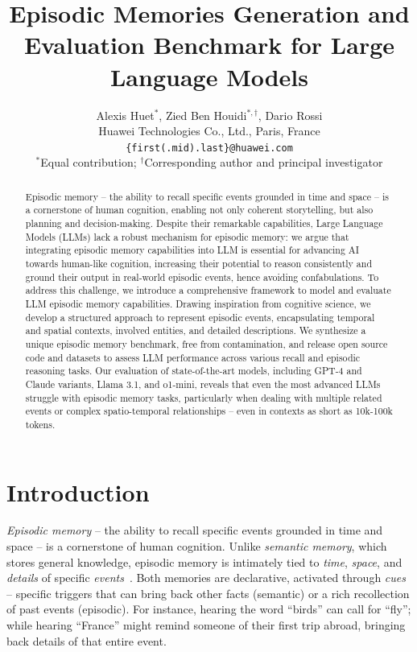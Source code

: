 \documentclass{article}
\title{Episodic Memories Generation and Evaluation Benchmark for Large Language Models}
\author{Alexis Huet$^{*}$, Zied Ben Houidi$^{*,\dagger}$, Dario Rossi\\
Huawei Technologies Co., Ltd., Paris, France \\
\texttt{\{first(.mid).last\}@huawei.com} \\
\small{$^*$Equal contribution}; \small{$^\dagger$Corresponding author and principal investigator}
}
\begin{document}
\maketitle

\begin{abstract}
Episodic memory -- the ability to recall specific events grounded in time and space -- is a cornerstone of human cognition, enabling not only coherent storytelling, but also planning and decision-making. Despite their remarkable capabilities, Large Language Models (LLMs) lack a robust mechanism for episodic memory: we argue that integrating episodic memory capabilities into LLM is essential for advancing AI towards human-like cognition, increasing their potential to reason consistently and ground their output in real-world episodic events, hence avoiding confabulations. To address this challenge, we introduce a comprehensive framework to model and evaluate LLM episodic memory capabilities. Drawing inspiration from cognitive science, we develop a structured approach to represent episodic events, encapsulating temporal and spatial contexts, involved entities, and detailed descriptions. We synthesize a unique episodic memory benchmark, free from contamination,
and release open source code and datasets to assess LLM performance across various recall and episodic reasoning tasks. Our evaluation of state-of-the-art models, including GPT-4 and Claude variants, Llama 3.1, and o1-mini, reveals that even the most advanced LLMs struggle with episodic memory tasks, particularly when dealing with multiple related events or complex spatio-temporal relationships -- even in contexts as short as 10k-100k tokens. 
\end{abstract}




\section{Introduction}
\textit{Episodic memory} -- the ability to recall specific events grounded in time and space -- is a cornerstone of human cognition. Unlike \textit{semantic memory}, which stores general knowledge, episodic memory is intimately tied to \textit{time}, \textit{space}, and \textit{details} of specific \textit{events}~\citep{Tulving1972,Tulving1973}. Both memories are declarative, activated through \textit{cues}
-- specific triggers that can bring back other facts (semantic) or a rich recollection of past events (episodic). For instance, hearing the word ``birds'' can call for ``fly''; while hearing ``France'' might remind someone of their first trip abroad, bringing back details of that entire event.
\end{document}
